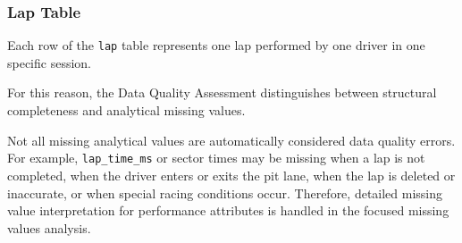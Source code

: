 \documentclass[a4paper,11pt]{article}
\begin{document}
	\subsubsection{Lap Table}
	
	Each row of the \texttt{lap} table represents one lap performed by one driver in
	one specific session. 
	
	For this reason, the Data
	Quality Assessment distinguishes between structural completeness and analytical
	missing values.
	
	Not all missing analytical values are automatically considered data quality errors.
	For example, \texttt{lap\_time\_ms} or sector times may be missing when a lap is
	not completed, when the driver enters or exits the pit lane, when the lap is deleted
	or inaccurate, or when special racing conditions occur. Therefore, detailed missing
	value interpretation for performance attributes is handled in the focused missing
	values analysis.
	
\end{document}
